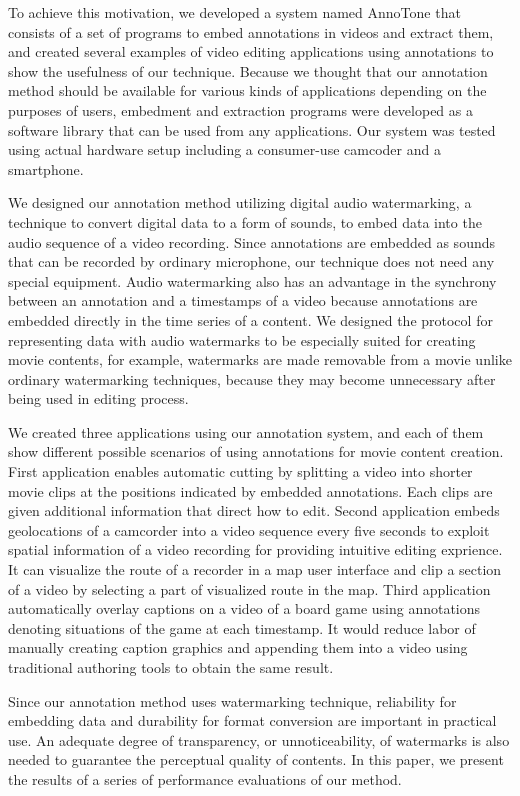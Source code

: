 To achieve this motivation, we developed a system named AnnoTone that consists of a set of programs to embed annotations in videos and extract them, and created several examples of video editing applications using annotations to show the usefulness of our technique.
Because we thought that our annotation method should be available for various kinds of applications depending on the purposes of users, embedment and extraction programs were developed as a software library that can be used from any applications.
Our system was tested using actual hardware setup including a consumer-use camcoder and a smartphone. %

We designed our annotation method utilizing digital audio watermarking, a technique to convert digital data to a form of sounds, to embed data into the audio sequence of a video recording.
Since annotations are embedded as sounds that can be recorded by ordinary microphone, our technique does not need any special equipment.
Audio watermarking also has an advantage in the synchrony between an annotation and a timestamps of a video because annotations are embedded directly in the time series of a content.
We designed the protocol for representing data with audio watermarks to be especially suited for creating movie contents, for example, watermarks are made removable from a movie unlike ordinary watermarking techniques, because they may become unnecessary after being used in editing process.

We created three applications using our annotation system, and each of them show different possible scenarios of using annotations for movie content creation.
First application enables automatic cutting by splitting a video into shorter movie clips at the positions indicated by embedded annotations.
Each clips are given additional information that direct how to edit.
Second application embeds geolocations of a camcorder into a video sequence every five seconds to exploit spatial information of a video recording for providing intuitive editing exprience.
It can visualize the route of a recorder in a map user interface and clip a section of a video by selecting a part of visualized route in the map.
Third application automatically overlay captions on a video of a board game using annotations denoting situations of the game at each timestamp.
It would reduce labor of manually creating caption graphics and appending them into a video using traditional authoring tools to obtain the same result.

Since our annotation method uses watermarking technique, reliability for embedding data and durability for format conversion are important in practical use.
An adequate degree of transparency, or unnoticeability, of watermarks is also needed to guarantee the perceptual quality of contents.
In this paper, we present the results of a series of performance evaluations of our method.
